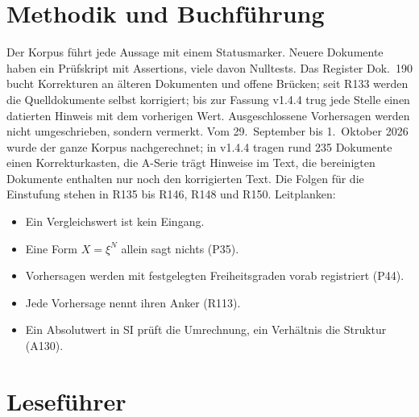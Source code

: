 \section{Methodik und Buchführung}

Der Korpus führt jede Aussage mit einem Statusmarker. Neuere Dokumente haben ein Prüfskript mit
Assertions, viele davon Nulltests. Das Register Dok.~190 bucht Korrekturen an älteren
Dokumenten und offene Brücken; seit R133 werden die Quelldokumente selbst korrigiert; bis zur Fassung v1.4.4 trug jede
Stelle einen datierten Hinweis mit dem vorherigen Wert. Ausgeschlossene Vorhersagen werden nicht
umgeschrieben, sondern vermerkt. Vom 29.~September bis 1.~Oktober 2026 wurde der ganze Korpus
nachgerechnet; in v1.4.4 tragen rund 235 Dokumente einen Korrekturkasten, die A-Serie trägt
Hinweise im Text, die bereinigten Dokumente enthalten nur noch den korrigierten Text. Die Folgen
für die Einstufung stehen in R135 bis R146, R148 und R150. Leitplanken:
\begin{itemize}[leftmargin=*,itemsep=1pt]
\item Ein Vergleichswert ist kein Eingang.
\item Eine Form $X=\xi^N$ allein sagt nichts (P35).
\item Vorhersagen werden mit festgelegten Freiheitsgraden vorab registriert (P44).
\item Jede Vorhersage nennt ihren Anker (R113).
\item Ein Absolutwert in SI prüft die Umrechnung, ein Verhältnis die Struktur (A130).
\end{itemize}

\section{Leseführer}

